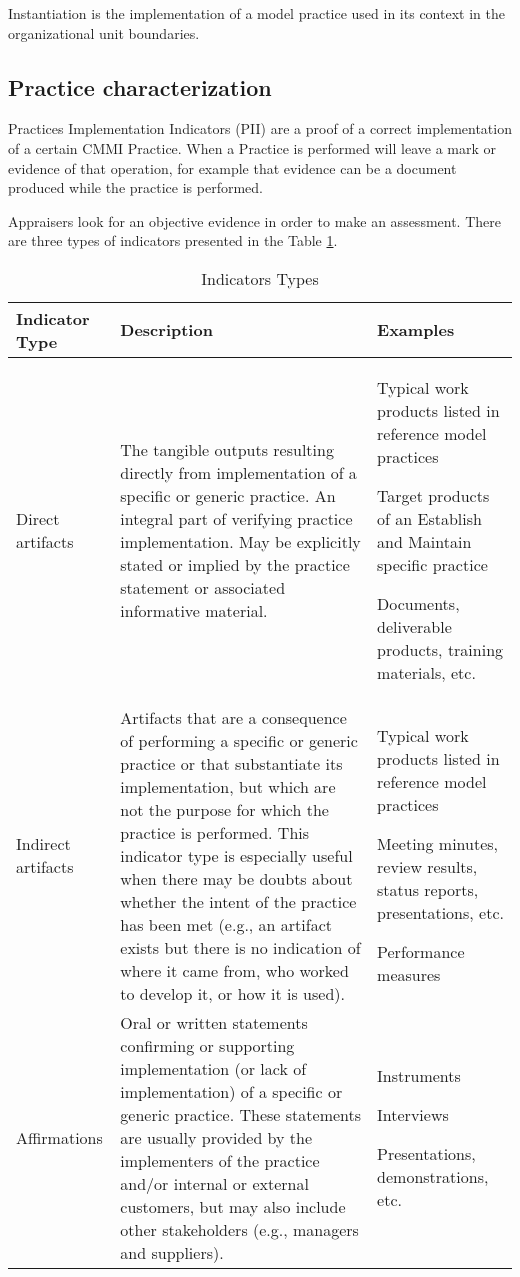 Instantiation is the implementation of a model practice used in its context in the organizational unit boundaries.

\subsection{Practice characterization}
Practices Implementation Indicators (PII) are a proof of  a correct implementation of a certain CMMI Practice. When a Practice is performed will leave a mark or evidence of that operation, for example that evidence can be a document produced while the practice is performed.

Appraisers look for an objective evidence in order to make an assessment. There are three types of indicators presented in the Table \ref{tab:Indicator}.


\begin{table}[h]
	\centering
	\caption{Indicators Types}
	\begin{tabular}{|p{2cm}|p{7cm}|p{4cm}|}
		\hline Indicator Type & Description & Examples\\
		\hline Direct artifacts & The tangible outputs resulting directly 
		from implementation of a specific or 
		generic practice. An integral part of 
		verifying practice implementation. May 
		be explicitly stated or implied by the 
		practice statement or associated 
		informative material. & Typical work products listed 
		in reference model practices 
		
		Target products of an 
		Establish and Maintain specific practice 
		
		Documents, deliverable 
		products, training materials, 
		etc. \\ 
		\hline Indirect artifacts & Artifacts that are a consequence of 
		performing a specific or generic practice 
		or that substantiate its implementation, 
		but which are not the purpose for which 
		the practice is performed. This indicator 
		type is especially useful when there may 
		be doubts about whether the intent of the 
		practice has been met (e.g., an artifact 
		exists but there is no indication of where 
		it came from, who worked to develop it, 
		or how it is used).  & Typical work products listed 
		in reference model practices 
		
		Meeting minutes, review 
		results, status reports, 
		presentations, etc. 
		
		Performance measures \\ 
		\hline Affirmations & Oral or written statements confirming or 
		supporting implementation (or lack of 
		implementation) of a specific or generic 
		practice. These statements are usually 
		provided by the implementers of the 
		practice and/or internal or external 
		customers, but may also include other 
		stakeholders (e.g., managers and 
		suppliers). &  Instruments 
		
		Interviews 
		
		Presentations, 
		demonstrations, etc.\\ 
		\hline 
	\end{tabular}
	\label{tab:Indicator}
\end{table}


